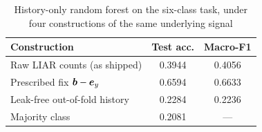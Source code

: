 \begin{table}[t]
\caption{History-only random forest on the six-class task, under four
constructions of the same underlying signal}
\label{tab:effect}
\centering
\footnotesize
\begin{tabular}{@{}lcc@{}}
\toprule
Construction & Test acc. & Macro-F1 \\
\midrule
Raw LIAR counts (as shipped)   & 0.3944 & 0.4056 \\
Prescribed fix $\boldsymbol{b}-\boldsymbol{e}_y$\rlap{$^\ast$} & 0.6594 & 0.6633 \\
Leak-free out-of-fold history  & 0.2284 & 0.2236 \\
\midrule
Majority class                 & 0.2081 & --- \\
\bottomrule
\end{tabular}
\end{table}
